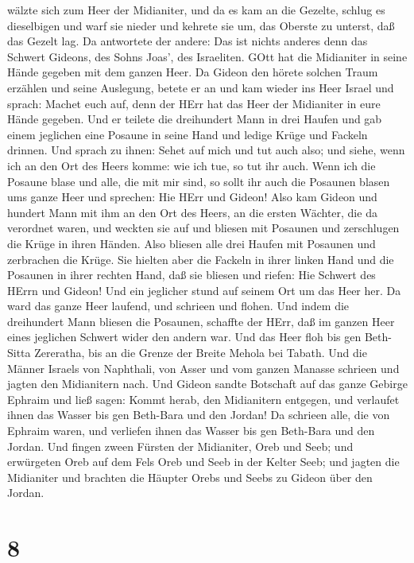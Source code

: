 wälzte sich zum Heer der Midianiter, und da es kam an die Gezelte,
schlug es dieselbigen und warf sie nieder und kehrete sie um, das
Oberste zu unterst, daß das Gezelt lag.  Da antwortete der
andere: Das ist nichts anderes denn das Schwert Gideons, des Sohns
Joas', des Israeliten. GOtt hat die Midianiter in seine Hände gegeben
mit dem ganzen Heer.  Da Gideon den hörete solchen Traum
erzählen und seine Auslegung, betete er an und kam wieder ins Heer
Israel und sprach: Machet euch auf, denn der HErr hat das Heer der
Midianiter in eure Hände gegeben.  Und er teilete die
dreihundert Mann in drei Haufen und gab einem jeglichen eine Posaune in
seine Hand und ledige Krüge und Fackeln drinnen.  Und
sprach zu ihnen: Sehet auf mich und tut auch also; und siehe, wenn ich
an den Ort des Heers komme: wie ich tue, so tut ihr auch. 
Wenn ich die Posaune blase und alle, die mit mir sind, so sollt ihr auch
die Posaunen blasen ums ganze Heer und sprechen: Hie HErr und Gideon!
 Also kam Gideon und hundert Mann mit ihm an den Ort des
Heers, an die ersten Wächter, die da verordnet waren, und weckten sie
auf und bliesen mit Posaunen und zerschlugen die Krüge in ihren Händen.
 Also bliesen alle drei Haufen mit Posaunen und zerbrachen
die Krüge. Sie hielten aber die Fackeln in ihrer linken Hand und die
Posaunen in ihrer rechten Hand, daß sie bliesen und riefen: Hie Schwert
des HErrn und Gideon!  Und ein jeglicher stund auf seinem
Ort um das Heer her. Da ward das ganze Heer laufend, und schrieen und
flohen.  Und indem die dreihundert Mann bliesen die
Posaunen, schaffte der HErr, daß im ganzen Heer eines jeglichen Schwert
wider den andern war. Und das Heer floh bis gen Beth-Sitta Zereratha,
bis an die Grenze der Breite Mehola bei Tabath.  Und die
Männer Israels von Naphthali, von Asser und vom ganzen Manasse schrieen
und jagten den Midianitern nach.  Und Gideon sandte
Botschaft auf das ganze Gebirge Ephraim und ließ sagen: Kommt herab, den
Midianitern entgegen, und verlaufet ihnen das Wasser bis gen Beth-Bara
und den Jordan! Da schrieen alle, die von Ephraim waren, und verliefen
ihnen das Wasser bis gen Beth-Bara und den Jordan.  Und
fingen zween Fürsten der Midianiter, Oreb und Seeb; und erwürgeten Oreb
auf dem Fels Oreb und Seeb in der Kelter Seeb; und jagten die Midianiter
und brachten die Häupter Orebs und Seebs zu Gideon über den Jordan.

\hypertarget{section-7}{%
\section{8}\label{section-7}}


